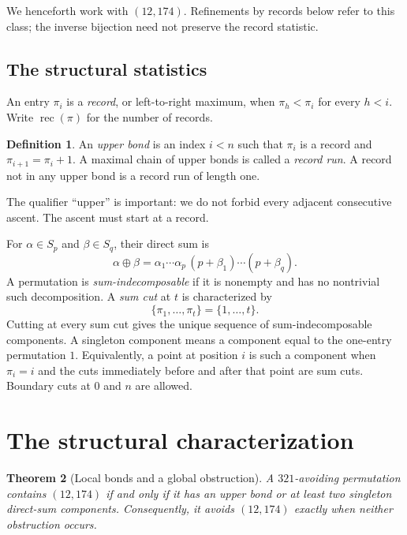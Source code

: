 \documentclass[11pt,a4paper]{article}
\newtheorem{theorem}{Theorem}[section]
\theoremstyle{definition}
\newtheorem{definition}[theorem]{Definition}
\theoremstyle{remark}
\newcommand{\rec}{\operatorname{rec}}
\begin{document}
We henceforth work with $(12,174)$. Refinements by records below refer to
this class; the inverse bijection need not preserve the record statistic.

\subsection{The structural statistics}

An entry $\pi_i$ is a \emph{record}, or left-to-right maximum, when
$\pi_h<\pi_i$ for every $h<i$. Write $\rec(\pi)$ for the number of records.

\begin{definition}
An \emph{upper bond} is an index $i<n$ such that $\pi_i$ is a record and
$\pi_{i+1}=\pi_i+1$. A maximal chain of upper bonds is called a
\emph{record run}. A record not in any upper bond is a record run of length
one.
\end{definition}

The qualifier ``upper'' is important: we do not forbid every adjacent
consecutive ascent. The ascent must start at a record.

For $\alpha\in S_p$ and $\beta\in S_q$, their direct sum is
\[
 \alpha\oplus\beta
 =\alpha_1\cdots\alpha_p\,(p+\beta_1)\cdots(p+\beta_q).
\]
A permutation is \emph{sum-indecomposable} if it is nonempty and has no
nontrivial such decomposition. A \emph{sum cut} at $t$ is characterized by
\[
 \{\pi_1,\ldots,\pi_t\}=\{1,\ldots,t\}.
\]
Cutting at every sum cut gives the unique sequence of sum-indecomposable
components. A singleton component means a component equal to the
one-entry permutation $1$. Equivalently, a point at position $i$ is such a
component when $\pi_i=i$ and the cuts immediately before and after that
point are sum cuts. Boundary cuts at $0$ and $n$ are allowed.

\section{The structural characterization}

\begin{theorem}[Local bonds and a global obstruction]\label{thm:structure}
A $321$-avoiding permutation contains $(12,174)$ if and only if it has an
upper bond or at least two singleton direct-sum components.
Consequently, it avoids $(12,174)$ exactly when neither obstruction occurs.
\end{theorem}
\end{document}
